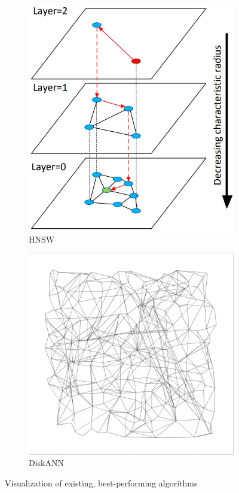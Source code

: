 \begin{figure}[ht]
    \centering
    \hfill
    \begin{subfigure}{0.45\textwidth}
        \centering
        \includegraphics[height=0.2\textheight]{images/hnsw}
        \caption{HNSW \cite{hnsw}}
        \label{fig:hnsw-viz}
    \end{subfigure}
    \hfill
    \begin{subfigure}{0.45\textwidth}
        \centering
        \includegraphics[height=0.2\textheight]{images/diskann}
        \caption{DiskANN \cite{diskann-paper}}
        \label{fig:diskann-viz}
    \end{subfigure}
    \hfill
    \caption{Visualization of existing, best-performing algorithms}
\end{figure}


